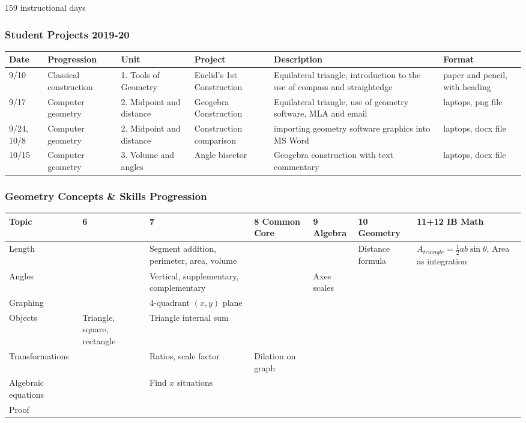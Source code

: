 \documentclass[12pt, twoside]{article}
\begin{document}
159 instructional days

\newpage
\subsubsection*{Student Projects 2019-20}

\begin{tabular}{|p{1cm}|p{2.5cm}|p{3cm}|p{4cm}|p{8cm}|p{4cm}|}
  \hline
  Date & Progression & Unit & Project & Description & Format \\
  \hline
  9/10 & Classical construction & 1. Tools of Geometry & Euclid's 1st Construction & Equilateral triangle, introduction to the use of compass and straightedge & paper and pencil, with heading \\
  \hline
  9/17 & Computer geometry & 2. Midpoint and distance & Geogebra Construction & Equilateral triangle, use of geometry software, MLA and email & laptops, png file \\
  \hline
  9/24, 10/8 & Computer geometry & 2. Midpoint and distance & Construction comparison & importing geometry software graphics into MS Word & laptops, docx file \\
  \hline
  10/15 & Computer geometry & 3. Volume and angles & Angle bisector & Geogebra construction with text commentary & laptops, docx file \\
  \hline
\end{tabular}

\newpage
\subsubsection*{Geometry Concepts \& Skills Progression}

\begin{tabular}{|p{3cm}|p{2cm}|p{4cm}|p{2cm}|p{2cm}|p{3.5cm}|p{4cm}|}
  \hline
  Topic & 6 & 7 & 8 Common Core & 9 Algebra & 10 Geometry & 11+12 IB Math \\
  \hline \hline
  Length &  & Segment addition, perimeter, area, volume &  &  & Distance formula & $A_{triangle}=\frac{1}{2}ab \sin \theta$, Area as integration \\
  \hline
  Angles &  & Vertical, supplementary, complementary & & Axes scales & & \\
  \hline
  Graphing &  & 4-quadrant $(x,y)$ plane &  &  & & \\
  \hline
  Objects & Triangle, square, rectangle  & Triangle internal sum & & & & \\
  \hline
  Transformations &  & Ratios, scale factor & Dilation on graph  & & & \\
  \hline
  Algebraic equations & & Find $x$ situations & & & & \\
  \hline
  Proof & & & & & & \\
  \hline
\end{tabular}
\end{document}
